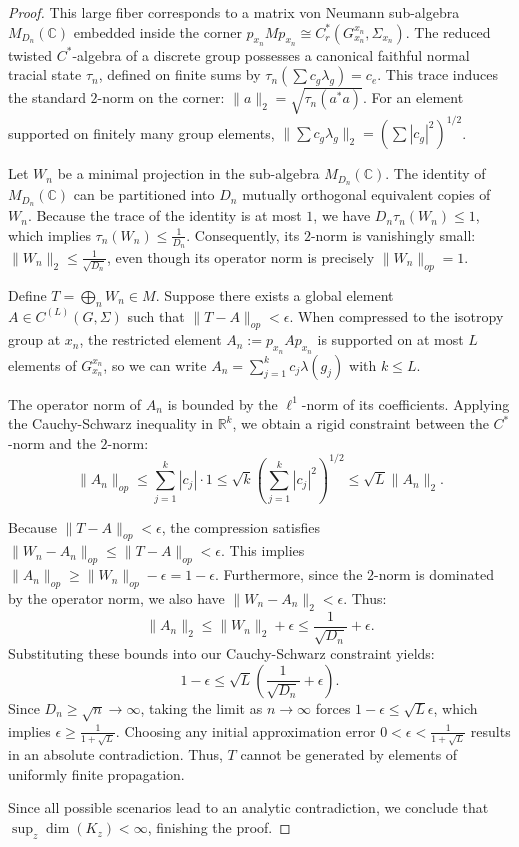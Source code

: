 \begin{proof}
This large fiber corresponds to a matrix von Neumann sub-algebra $M_{D_n}(\mathbb{C})$ embedded inside the corner $p_{x_n} M p_{x_n} \cong C_r^*(G_{x_n}^{x_n}, \Sigma_{x_n})$. 
The reduced twisted $C^*$-algebra of a discrete group possesses a canonical faithful normal tracial state $\tau_n$, defined on finite sums by $\tau_n(\sum c_g \lambda_g) = c_e$. This trace induces the standard $2$-norm on the corner: $\|a\|_2 = \sqrt{\tau_n(a^*a)}$. For an element supported on finitely many group elements, $\| \sum c_g \lambda_g \|_2 = (\sum |c_g|^2)^{1/2}$.
    
Let $W_n$ be a minimal projection in the sub-algebra $M_{D_n}(\mathbb{C})$. The identity of $M_{D_n}(\mathbb{C})$ can be partitioned into $D_n$ mutually orthogonal equivalent copies of $W_n$. Because the trace of the identity is at most $1$, we have $D_n \tau_n(W_n) \le 1$, which implies $\tau_n(W_n) \le \frac{1}{D_n}$. Consequently, its $2$-norm is vanishingly small: $\|W_n\|_2 \le \frac{1}{\sqrt{D_n}}$, even though its operator norm is precisely $\|W_n\|_{op} = 1$.
    
Define $T = \bigoplus_n W_n \in M$. Suppose there exists a global element $A \in C^{(L)}(G, \Sigma)$ such that $\|T - A\|_{op} < \epsilon$. 
When compressed to the isotropy group at $x_n$, the restricted element $A_n := p_{x_n} A p_{x_n}$ is supported on at most $L$ elements of $G_{x_n}^{x_n}$, so we can write $A_n = \sum_{j=1}^k c_j \lambda(g_j)$ with $k \le L$. 
    
The operator norm of $A_n$ is bounded by the $\ell^1$-norm of its coefficients. Applying the Cauchy-Schwarz inequality in $\mathbb{R}^k$, we obtain a rigid constraint between the $C^*$-norm and the $2$-norm:
\[
\|A_n\|_{op} \le \sum_{j=1}^k |c_j| \cdot 1 \le \sqrt{k} \left( \sum_{j=1}^k |c_j|^2 \right)^{1/2} \le \sqrt{L} \|A_n\|_2.
\]

Because $\|T - A\|_{op} < \epsilon$, the compression satisfies $\|W_n - A_n\|_{op} \le \|T - A\|_{op} < \epsilon$. This implies $\|A_n\|_{op} \ge \|W_n\|_{op} - \epsilon = 1 - \epsilon$.
Furthermore, since the $2$-norm is dominated by the operator norm, we also have $\|W_n - A_n\|_2 < \epsilon$. Thus:
\[
\|A_n\|_2 \le \|W_n\|_2 + \epsilon \le \frac{1}{\sqrt{D_n}} + \epsilon.
\]
Substituting these bounds into our Cauchy-Schwarz constraint yields:
\[
1 - \epsilon \le \sqrt{L} \left( \frac{1}{\sqrt{D_n}} + \epsilon \right).
\]
Since $D_n \ge \sqrt{n} \to \infty$, taking the limit as $n \to \infty$ forces $1 - \epsilon \le \sqrt{L} \epsilon$, which implies $\epsilon \ge \frac{1}{1 + \sqrt{L}}$.
Choosing any initial approximation error $0 < \epsilon < \frac{1}{1 + \sqrt{L}}$ results in an absolute contradiction. Thus, $T$ cannot be generated by elements of uniformly finite propagation.

\medskip
Since all possible scenarios lead to an analytic contradiction, we conclude that $\sup_z \dim(K_z) < \infty$, finishing the proof.
\end{proof}

